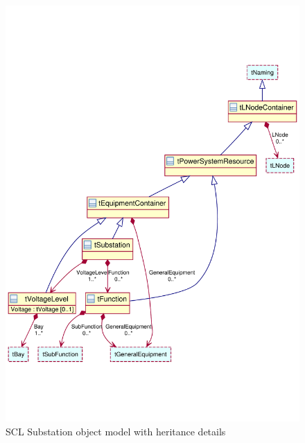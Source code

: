 \begin{figure}
  \includegraphics[width=1.0\linewidth]
  				{chapters/ch-scl/figures/SCL-uml-substation-Deept2}
  \caption{SCL Substation object model with heritance 
  details  } 
  \label{fig:pdf-SCL-uml-substation-Deept2}
\end{figure}


